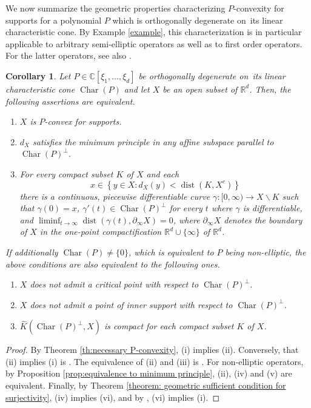 \documentclass[a4paper,10pt]{amsart}
\newtheorem{corollary}[theorem]{Corollary}
\newtheorem*{crucial lemma}{Lemma \ref{lem:nice polynomial2}}
\theoremstyle{definition}
\newcommand{\R}{\mathbb{R}}
\newcommand{\C}{\mathbb{C}}
\newcommand{\charcone}{\operatorname{Char}}
\newcommand{\veryniceon}[1]{orthogonally degenerate on~#1}
\begin{document}
We now summarize the geometric properties characterizing $P$-convexity for supports for a polynomial $P$ which is \veryniceon{its linear characteristic cone}. By Example \ref{example}, this characterization is in particular applicable to arbitrary semi-elliptic operators as well as to first order operators. For the latter operators, see also \cite[Theorem 4]{Zachmanoglou69}.

\begin{corollary}\label{cor:characterization P-convexity}
	Let $P\in\C[\xi_1,\ldots,\xi_d]$ be \veryniceon{its linear characteristic cone $\charcone(P)$} and let $X$ be an open subset of $\R^d$. Then, the following assertions are equivalent.
	\begin{enumerate}[{\upshape(i)}]
		\item $X$ is $P$-convex for supports.
		\item $d_X$ satisfies the minimum principle in any affine subspace parallel to $\charcone(P)^\perp$.
		\item For every compact subset $K$ of $X$ and each
		\[x\in \left\{y\in X\colon d_X(y)<\operatorname{dist}(K,X^c)\right\}\]
		there is a continuous, piecewise differentiable curve $\gamma\colon[0,\infty)\rightarrow X\backslash K$ such that $\gamma(0)=x$, $\gamma'(t)\in \charcone(P)^\perp$ for every $t$ where $\gamma$ is differentiable, and $\liminf_{t\rightarrow\infty}\operatorname{dist}(\gamma(t),\partial_\infty X)=0$, where $\partial_\infty X$ denotes the boundary of $X$ in the one-point compactification $\R^d\cup\{\infty\}$ of $\R^d$.
    \end{enumerate}
    If additionally $\charcone(P)\neq \{0\}$, which is equivalent to $P$ being non-elliptic, the above conditions are also equivalent to the following ones.
    \begin{enumerate}
        \item[{\upshape(iv)}] $X$ does not admit a critical point with respect to $\charcone(P)^\perp$.
        \item[{\upshape(v)}] $X$ does not admit a point of inner support with respect to $\charcone(P)^\perp$.
        \item[{\upshape(vi)}] $\widehat{K}(\charcone(P)^\perp,X)$ is compact for each compact subset $K$ of $X$.
	\end{enumerate}
\end{corollary}

\begin{proof}
    By Theorem \ref{th:necessary P-convexity}, (i) implies (ii). Conversely, that (ii) implies (i) is \cite[Theorem 1]{Kalmes19}. The equivalence of (ii) and (iii) is \cite[Lemma 4]{Kalmes19}. For non-elliptic operators, by Proposition \ref{prop:equivalence to minimum principle}, (ii), (iv) and (v) are equivalent. Finally, by Theorem \ref{theorem: geometric sufficient condition for surjectivity}, (iv) implies (vi), and by \cite[Theorem 3]{Zachmanoglou69}, (vi) implies (i).
\end{proof}
\end{document}
